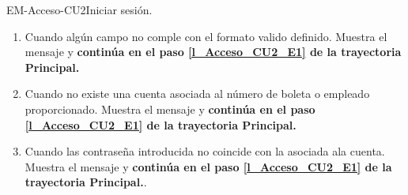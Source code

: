 \begin{UseCase}{EM-Acceso-CU2}{Iniciar sesión.}
{\begin{enumerate}
		       	\item \label{EM-Acceso-CU2-E2} Cuando algún campo no comple con el formato valido definido. Muestra el mensaje  y \textbf{continúa en el paso \ref{l_Acceso_CU2_E1} de la trayectoria Principal.}

		       	\item \label{EM-Acceso-CU2-E3} Cuando no existe una cuenta asociada al número de boleta o empleado proporcionado. Muestra el mensaje  y \textbf{continúa en el paso \ref{l_Acceso_CU2_E1} de la trayectoria Principal.}

		       	\item \label{EM-Acceso-CU02-E4} Cuando las contraseña introducida no coincide con la asociada ala cuenta. Muestra el mensaje  y \textbf{continúa en el paso \ref{l_Acceso_CU2_E1} de la trayectoria Principal.}.
	       	\end{enumerate}
	    }
	\end{UseCase}
	

